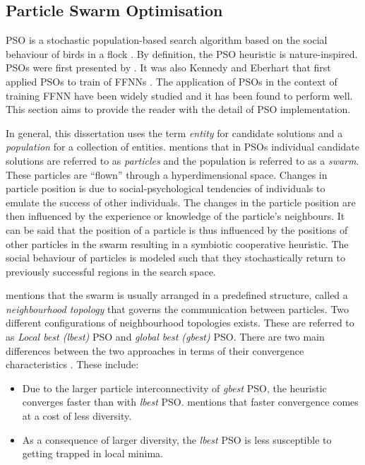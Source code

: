 \subsection{Particle Swarm Optimisation}
\label{sec:heuristics:mh:pso}

\Ac{PSO} is a stochastic population-based search algorithm based on the social behaviour of birds in a flock \cite{ref:kennedy:1995}. By definition, the \ac{PSO} heuristic is nature-inspired.  \Acp{PSO} were first presented  by \citeauthor{ref:kennedy:1995}\cite{ref:kennedy:1995}. It was also Kennedy and Eberhart that first applied \acp{PSO} to train of \acp{FFNN} \cite{ref:eberhart:1995}\cite{ref:kennedy:1997}. The application of \acp{PSO} in the context of training \ac{FFNN} have been widely studied \cite{ref:rakitianskaia:2012}\cite{ref:vanwyk:2014} and it has been found to perform well. This section aims to provide the reader with the detail of \ac{PSO} implementation.

In general, this dissertation uses the term \textit{entity} for candidate solutions and a \textit{population} for a collection of entities. \citeauthor{ref:engelbrecht:2007}\cite{ref:engelbrecht:2007} mentions that in \acp{PSO} individual candidate solutions are referred to as \textit{particles} and the population is referred to as a \textit{swarm}. These particles are ``flown'' through a hyperdimensional space. Changes in particle position is due to social-psychological tendencies of individuals to emulate the success of other individuals. The changes in the particle position are then influenced by the experience or knowledge of the particle's neighbours. It can be said that the position of a particle is thus influenced by the positions of other particles in the swarm resulting in a symbiotic cooperative heuristic. The social behaviour of particles is modeled such that they stochastically return to previously successful regions in the search space.

\citeauthor{ref:vanwyk:2014}\cite{ref:vanwyk:2014} mentions that the swarm is usually arranged in a predefined structure, called a \textit{neighbourhood topology} that governs the communication between particles. Two different configurations of neighbourhood topologies exists. These are referred to as \textit{Local best (lbest)} \ac{PSO} and \textit{global best (gbest)} \ac{PSO}. There are two main differences between the two approaches in terms of their convergence characteristics \cite{ref:eberhart:1996}. These include:

\begin{itemize}
      \item Due to the larger particle interconnectivity of \textit{gbest} \ac{PSO}, the heuristic converges faster than with \textit{lbest} \ac{PSO}. \cite{ref:engelbrecht:2007} mentions that faster convergence comes at a cost of less diversity.
      \item As a consequence of larger diversity, the \textit{lbest} \ac{PSO} is less susceptible to getting trapped in local minima.
\end{itemize}

